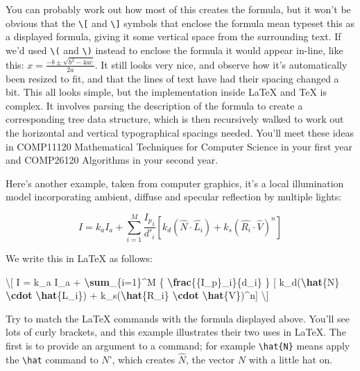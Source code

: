 \documentclass[
]{book}
\newenvironment{Shaded}{\begin{snugshade}}{\end{snugshade}}
\newcommand{\SpecialCharTok}[1]{\textcolor[rgb]{0.81,0.36,0.00}{\textbf{#1}}}
\newcommand{\SpecialStringTok}[1]{\textcolor[rgb]{0.31,0.60,0.02}{#1}}
\begin{document}
You can probably work out how most of this creates the formula, but it won't be obvious that the \texttt{\textbackslash{}{[}} and \texttt{\textbackslash{}{]}} symbols that enclose the formula mean typeset this as a displayed formula, giving it some vertical space from the surrounding text. If we'd used \texttt{\textbackslash{}(} and \texttt{\textbackslash{})} instead to enclose the formula it would appear in-line, like this: \(x = \frac{-b \pm \sqrt{b^2-4ac}}{2a}\). It still looks very nice, and observe how it's automatically been resized to fit, and that the lines of text have had their spacing changed a bit. This all looks simple, but the implementation inside LaTeX and TeX is complex. It involves parsing the description of the formula to create a corresponding tree data structure, which is then recursively walked to work out the horizontal and vertical typographical spacings needed. You'll meet these ideas in COMP11120 Mathematical Techniques for Computer Science in your first year and COMP26120 Algorithms in your second year.

Here's another example, taken from computer graphics, it's a local illumination model incorporating ambient, diffuse and specular reflection by multiple lights:

\[ I = k_a I_a + \sum_{i=1}^M {\frac{{I_p}_i}{d'_i}} [ k_d(\hat{N}\cdot\hat{L_i}) + k_s(\hat{R_i}\cdot\hat{V})^n] \]

We write this in LaTeX as follows:

\begin{Shaded}
\begin{Highlighting}[]
    \SpecialStringTok{\textbackslash{}[ I = k\_a I\_a + }\SpecialCharTok{\textbackslash{}sum}\SpecialStringTok{\_\{i=1\}\^{}M \{ }\SpecialCharTok{\textbackslash{}frac}\SpecialStringTok{\{\{I\_p\}\_i\}\{d\textquotesingle{}\_i\} \}}
\SpecialStringTok{    [ k\_d(}\SpecialCharTok{\textbackslash{}hat}\SpecialStringTok{\{N\} }\SpecialCharTok{\textbackslash{}cdot}\SpecialStringTok{ }\SpecialCharTok{\textbackslash{}hat}\SpecialStringTok{\{L\_i\})}
\SpecialStringTok{    + k\_s(}\SpecialCharTok{\textbackslash{}hat}\SpecialStringTok{\{R\_i\} }\SpecialCharTok{\textbackslash{}cdot}\SpecialStringTok{ }\SpecialCharTok{\textbackslash{}hat}\SpecialStringTok{\{V\})\^{}n] \textbackslash{}]}
\end{Highlighting}
\end{Shaded}

Try to match the LaTeX commands with the formula displayed above. You'll see lots of curly brackets, and this example illustrates their two uses in LaTeX. The first is to provide an argument to a command; for example \texttt{\textbackslash{}hat\{N\}} means apply the \texttt{\textbackslash{}hat} command to \(N\)', which creates \(\hat{N}\), the vector \(N\) with a little hat on.
\end{document}
